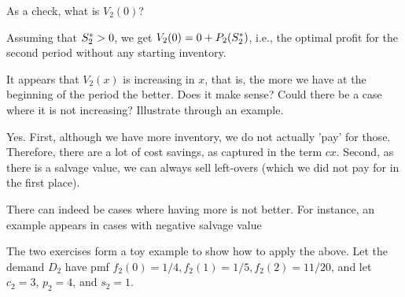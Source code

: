 \begin{exercise}
As a check, what is $V_2(0)$? 
  \begin{solution}
    Assuming that $S_2^*>0$, we get $V_2(0) = 0 + P_2(S_2^*)$, i.e., the optimal profit for the second period without any starting inventory. 
  \end{solution}
\end{exercise}


\begin{exercise}
It appears that $V_2(x)$ is increasing in $x$, that is, the more we have at the beginning of the period the better. Does it make sense? Could there be a case where it is not increasing? Illustrate through an example.
\begin{solution}
Yes. First, although we have more inventory, we do not actually 'pay' for those. Therefore, there are a lot of cost savings, as  captured in the term $cx$. Second, as there is a salvage value, we can always sell left-overs (which we did not pay for in the first place). 

There can indeed be cases where having more is not better. For instance, an example appears in cases with negative salvage value
\end{solution}
\end{exercise}

The two exercises form a toy example to show how to apply the above. Let the demand $D_2$ have  pmf 
$f_2(0)=1/4, f_2(1)=1/5, f_2(2)=11/20$, and let $c_2=3$, $p_2=4$, and $s_2=1$. 

